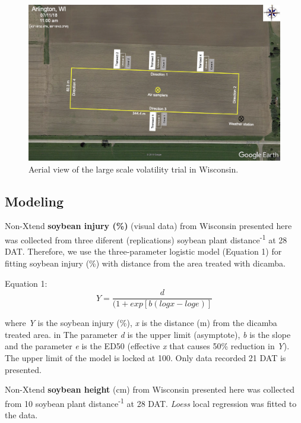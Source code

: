\documentclass[]{article}
\begin{document}
\begin{figure}[h]

{\centering \includegraphics[width=1\linewidth]{Wisconsin} 

}

\caption{Aerial view of the large scale volatility trial in Wisconsin.}\label{fig:unnamed-chunk-89}
\end{figure}

\pagebreak

\subsection{Modeling}\label{modeling-5}

Non-Xtend \textbf{soybean injury (\%)} (visual data) from Wisconsin
presented here was collected from three diferent (replications) soybean
plant distance\textsuperscript{-1} at 28 DAT. Therefore, we use the
three-parameter logistic model (Equation 1) for fitting soybean injury
(\%) with distance from the area treated with dicamba.

Equation 1: \[Y= \frac{d}{(1 + exp[b(logx - loge)]} \]

where \emph{Y} is the soybean injury (\%), \emph{x} is the distance (m)
from the dicamba treated area. in The parameter \emph{d} is the upper
limit (asymptote), \emph{b} is the slope and the parameter \emph{e} is
the ED50 (effective \emph{x} that causes 50\% reduction in \emph{Y}).
The upper limit of the model is locked at 100. Only data recorded 21 DAT
is presented.

Non-Xtend \textbf{soybean height} (cm) from Wisconsin presented here was
collected from 10 soybean plant distance\textsuperscript{-1} at 28 DAT.
\emph{Loess} local regression was fitted to the data.
\end{document}
